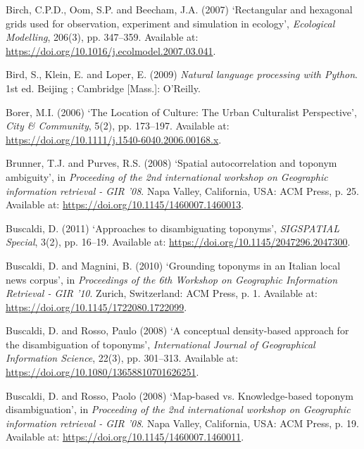 \documentclass[
  letterpaper,
  11pt,
  english,
  onehalfspacing,
  headsepline]{MastersDoctoralThesis}
\newlength{\cslhangindent}
\newlength{\cslentryspacingunit} %
\newenvironment{CSLReferences}[2] %
 {%
  \setlength{\parindent}{0pt}
  \ifodd #1
  \let\oldpar\par
  \def\par{\hangindent=\cslhangindent\oldpar}
  \fi
  \setlength{\parskip}{#2\cslentryspacingunit}
 }%
 {}
\begin{document}
\begin{CSLReferences}{0}{0}
\leavevmode{}%
Birch, C.P.D., Oom, S.P. and Beecham, J.A. (2007) {`Rectangular and
hexagonal grids used for observation, experiment and simulation in
ecology'}, \emph{Ecological Modelling}, 206(3), pp. 347--359. Available
at: \url{https://doi.org/10.1016/j.ecolmodel.2007.03.041}.

\leavevmode{}%
Bird, S., Klein, E. and Loper, E. (2009) \emph{Natural language
processing with {Python}}. 1st ed. {Beijing ; Cambridge {[}Mass.{]}}:
{O'Reilly}.

\leavevmode{}%
Borer, M.I. (2006) {`The {Location} of {Culture}: {The Urban Culturalist
Perspective}'}, \emph{City \& Community}, 5(2), pp. 173--197. Available
at: \url{https://doi.org/10.1111/j.1540-6040.2006.00168.x}.

\leavevmode{}%
Brunner, T.J. and Purves, R.S. (2008) {`Spatial autocorrelation and
toponym ambiguity'}, in \emph{Proceeding of the 2nd international
workshop on {Geographic} information retrieval - {GIR} '08}. {Napa
Valley, California, USA}: {ACM Press}, p. 25. Available at:
\url{https://doi.org/10.1145/1460007.1460013}.

\leavevmode{}%
Buscaldi, D. (2011) {`Approaches to disambiguating toponyms'},
\emph{SIGSPATIAL Special}, 3(2), pp. 16--19. Available at:
\url{https://doi.org/10.1145/2047296.2047300}.

\leavevmode{}%
Buscaldi, D. and Magnini, B. (2010) {`Grounding toponyms in an {Italian}
local news corpus'}, in \emph{Proceedings of the 6th {Workshop} on
{Geographic Information Retrieval} - {GIR} '10}. {Zurich, Switzerland}:
{ACM Press}, p. 1. Available at:
\url{https://doi.org/10.1145/1722080.1722099}.

\leavevmode{}%
Buscaldi, D. and Rosso, Paulo (2008) {`A conceptual density-based
approach for the disambiguation of toponyms'}, \emph{International
Journal of Geographical Information Science}, 22(3), pp. 301--313.
Available at: \url{https://doi.org/10.1080/13658810701626251}.

\leavevmode{}%
Buscaldi, D. and Rosso, Paolo (2008) {`Map-based vs. Knowledge-based
toponym disambiguation'}, in \emph{Proceeding of the 2nd international
workshop on {Geographic} information retrieval - {GIR} '08}. {Napa
Valley, California, USA}: {ACM Press}, p. 19. Available at:
\url{https://doi.org/10.1145/1460007.1460011}.


\end{CSLReferences}
\end{document}
